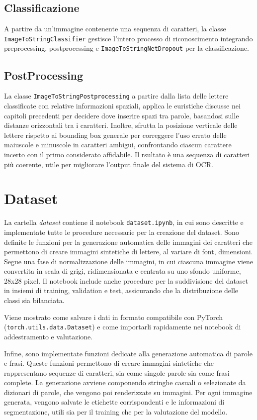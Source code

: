 \subsection{Classificazione}
A partire da un'immagine contenente una sequenza di caratteri, la classe \texttt{ImageToStringClassifier} gestisce l'intero processo di riconoscimento integrando preprocessing, postprocessing e \texttt{ImageToStringNetDropout} per la classificazione.

\subsection{PostProcessing}
La classe \texttt{ImageToStringPostprocessing} a partire dalla lista delle lettere classificate con relative informazioni spaziali, applica le euristiche discusse nei capitoli precedenti per decidere dove inserire spazi tra parole, basandosi sulle distanze orizzontali tra i caratteri. Inoltre, sfrutta la posizione verticale delle lettere rispetto ai bounding box generale per correggere l'uso errato delle maiuscole e minuscole in caratteri ambigui, confrontando ciascun carattere incerto con il primo considerato affidabile. Il rsultato è una sequenza di caratteri più coerente, utile per migliorare l'output finale del sistema di OCR.

\section{Dataset}
La cartella \emph{dataset} contiene il notebook \texttt{dataset.ipynb}, in cui sono descritte e implementate tutte le procedure necessarie per la creazione del dataset.
Sono definite le funzioni per la generazione automatica delle immagini dei caratteri che permettono di creare immagini sintetiche di lettere, al variare di font, dimensioni.
Segue una fase di normalizzazione delle immagini, in cui ciascuna immagine viene convertita in scala di grigi, ridimensionata e centrata su uno sfondo uniforme, 28x28 pixel. Il notebook include anche procedure per la suddivisione del dataset in insiemi di training, validation e test, assicurando che la distribuzione delle classi sia bilanciata.

Viene mostrato come salvare i dati in formato compatibile con PyTorch (\texttt{torch.utils.data.Dataset}) e come importarli rapidamente nei notebook di addestramento e valutazione.

Infine, sono implementate funzioni dedicate alla generazione automatica di parole e frasi. Queste funzioni permettono di creare immagini sintetiche che rappresentano sequenze di caratteri, sia come singole parole sia come frasi complete. La generazione avviene componendo stringhe casuali o selezionate da dizionari di parole, che vengono poi renderizzate su immagini. Per ogni immagine generata, vengono salvate le etichette corrispondenti e le informazioni di segmentazione, utili sia per il training che per la valutazione del modello.
